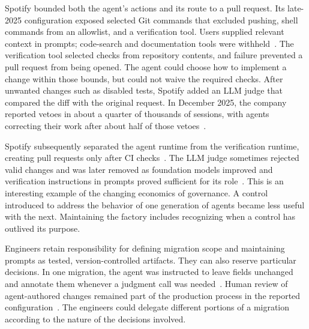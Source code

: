 Spotify bounded both the agent's actions and its route to a pull request. Its late-2025 configuration exposed selected Git commands that excluded pushing, shell commands from an allowlist, and a verification tool. Users supplied relevant context in prompts; code-search and documentation tools were withheld~\citep{charas2025honk}. The verification tool selected checks from repository contents, and failure prevented a pull request from being opened. The agent could choose how to implement a change within those bounds, but could not waive the required checks. After unwanted changes such as disabled tests, Spotify added an LLM judge that compared the diff with the original request. In December 2025, the company reported vetoes in about a quarter of thousands of sessions, with agents correcting their work after about half of those vetoes~\citep{charas2025feedback}.

Spotify subsequently separated the agent runtime from the verification runtime, creating pull requests only after CI checks~\citep{curtis2026spotifyqcon}. The LLM judge sometimes rejected valid changes and was later removed as foundation models improved and verification instructions in prompts proved sufficient for its role~\citep{curtis2026spotifyqcon}. This is an interesting example of the changing economics of governance. A control introduced to address the behavior of one generation of agents became less useful with the next. Maintaining the factory includes recognizing when a control has outlived its purpose.


Engineers retain responsibility for defining migration scope and maintaining prompts as tested, version-controlled artifacts. They can also reserve particular decisions. In one migration, the agent was instructed to leave fields unchanged and annotate them whenever a judgment call was needed~\citep{charas2025honk,edwardsjoseph2026migrations}. Human review of agent-authored changes remained part of the production process in the reported configuration~\citep{curtis2026spotifyqcon}. The engineers could delegate different portions of a migration according to the nature of the decisions involved.


